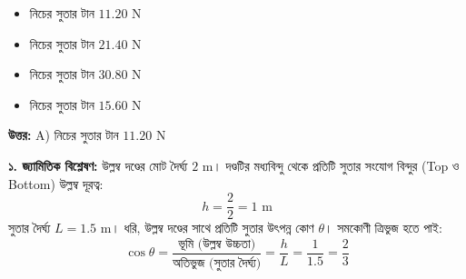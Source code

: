 \documentclass[12pt, a4paper]{article}
\begin{document}
{\begin{center}
\end{center}
\vspace{1em}

\begin{itemize}[label={}, leftmargin=1cm, itemsep=0.5em]
\item[\textbf{A)}] নিচের সুতার টান $11.20\text{ N}$
\item[\textbf{B)}] নিচের সুতার টান $21.40\text{ N}$
\item[\textbf{C)}] নিচের সুতার টান $30.80\text{ N}$
\item[\textbf{D)}] নিচের সুতার টান $15.60\text{ N}$
\end{itemize}

\vspace{0.5em}
\begin{tcolorbox}[answerbox]
\textbf{\color{success} উত্তর:} A) নিচের সুতার টান $11.20\text{ N}$
\end{tcolorbox}
\vspace{1em}

\begin{tcolorbox}[solutionbox={সমাধান (Solution)}]
\noindent
\textbf{১. জ্যামিতিক বিশ্লেষণ:}
উল্লম্ব দণ্ডের মোট দৈর্ঘ্য $2\text{ m}$। দণ্ডটির মধ্যবিন্দু থেকে প্রতিটি সুতার সংযোগ বিন্দুর (Top ও Bottom) উল্লম্ব দূরত্ব:
$$h = \frac{2}{2} = 1\text{ m}$$
সুতার দৈর্ঘ্য $L = 1.5\text{ m}$। 
ধরি, উল্লম্ব দণ্ডের সাথে প্রতিটি সুতার উৎপন্ন কোণ $\theta$। সমকোণী ত্রিভুজ হতে পাই:
$$\cos\theta = \frac{\text{ভূমি (উল্লম্ব উচ্চতা)}}{\text{অতিভুজ (সুতার দৈর্ঘ্য)}} = \frac{h}{L} = \frac{1}{1.5} = \frac{2}{3}$$


\end{tcolorbox}}
\end{document}
